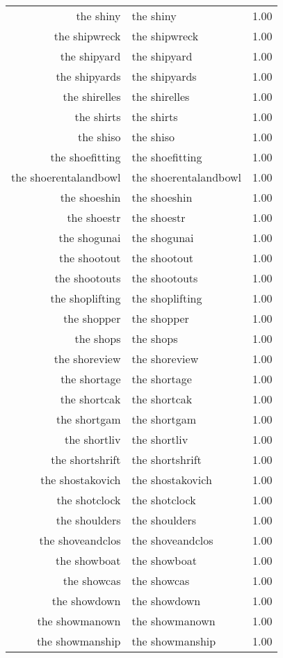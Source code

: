 \begin{table}[ht]
\begin{tabular}{rlr}
  the shiny & the shiny & 1.00 \\ 
  the shipwreck & the shipwreck & 1.00 \\ 
  the shipyard & the shipyard & 1.00 \\ 
  the shipyards & the shipyards & 1.00 \\ 
  the shirelles & the shirelles & 1.00 \\ 
  the shirts & the shirts & 1.00 \\ 
  the shiso & the shiso & 1.00 \\ 
  the shoefitting & the shoefitting & 1.00 \\ 
  the shoerentalandbowl & the shoerentalandbowl & 1.00 \\ 
  the shoeshin & the shoeshin & 1.00 \\ 
  the shoestr & the shoestr & 1.00 \\ 
  the shogunai & the shogunai & 1.00 \\ 
  the shootout & the shootout & 1.00 \\ 
  the shootouts & the shootouts & 1.00 \\ 
  the shoplifting & the shoplifting & 1.00 \\ 
  the shopper & the shopper & 1.00 \\ 
  the shops & the shops & 1.00 \\ 
  the shoreview & the shoreview & 1.00 \\ 
  the shortage & the shortage & 1.00 \\ 
  the shortcak & the shortcak & 1.00 \\ 
  the shortgam & the shortgam & 1.00 \\ 
  the shortliv & the shortliv & 1.00 \\ 
  the shortshrift & the shortshrift & 1.00 \\ 
  the shostakovich & the shostakovich & 1.00 \\ 
  the shotclock & the shotclock & 1.00 \\ 
  the shoulders & the shoulders & 1.00 \\ 
  the shoveandclos & the shoveandclos & 1.00 \\ 
  the showboat & the showboat & 1.00 \\ 
  the showcas & the showcas & 1.00 \\ 
  the showdown & the showdown & 1.00 \\ 
  the showmanown & the showmanown & 1.00 \\ 
  the showmanship & the showmanship & 1.00 \\ 

\end{tabular}
\end{table}
